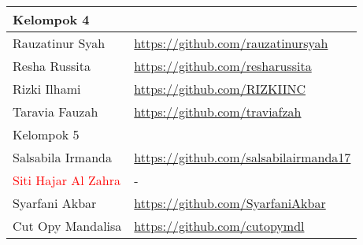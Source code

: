\documentclass[a4paper]{tufte-handout}
\begin{document}
\begin{projects}
\begin{description}
\begin{table}[!ht]
\begin{tabular}{ll}
\midrule
Kelompok 4\\
\midrule
Rauzatinur Syah			& \url{https://github.com/rauzatinursyah} \\
Resha Russita			& \url{https://github.com/resharussita} \\
Rizki Ilhami			& \url{https://github.com/RIZKIINC} \\
Taravia Fauzah			& \url{https://github.com/traviafzah} \\
\midrule
Kelompok 5\\
\midrule
Salsabila Irmanda		& \url{https://github.com/salsabilairmanda17} \\
\textcolor{red}{Siti Hajar Al Zahra	}	& - \\
Syarfani Akbar			& \url{https://github.com/SyarfaniAkbar} \\
Cut Opy Mandalisa		& \url{https://github.com/cutopymdl} \\
\midrule
\end{tabular}
\end{table}
	\end{description}
\end{projects}

\end{document}
